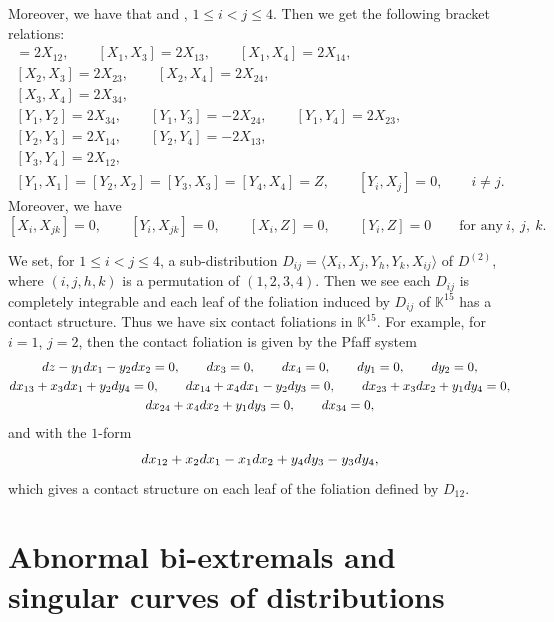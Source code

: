 \documentclass[11pt]{article}
\numberwithin{equation}{section}
\numberwithin{equation}{section}
\theoremstyle{definition}
\newcommand{\KK}{\mathbb{K}}
\newcommand{\0}{\boldsymbol{0}}
\newcommand{\pa}{\partial}
\begin{document}
Moreover, we have that
\smash{$Z = \frac{\pa}{\pa z}$} and \smash{$X_{ij} = \frac{\pa}{\pa x_{ij}}$}, $1 \leq i < j \leq 4$.
Then we get the following bracket relations:
\begin{gather*}
[X_1, X_2] = 2X_{12},\qquad [X_1, X_3] = 2X_{13},\qquad [X_1, X_4] = 2X_{14},
\\
 [X_2, X_3] = 2X_{23},\qquad [X_2, X_4] = 2X_{24},
\\
 [X_3, X_4] = 2X_{34},
\\
[Y_1, Y_2] = 2X_{34},\qquad [Y_1, Y_3] = -2X_{24},\qquad [Y_1, Y_4] = 2X_{23},
\\
 [Y_2, Y_3] = 2X_{14},\qquad [Y_2, Y_4] = -2X_{13},
\\
 [Y_3, Y_4] = 2X_{12},
\\
[Y_1, X_1] = [Y_2, X_2] = [Y_3, X_3] = [Y_4, X_4] = Z, \qquad [Y_i, X_j] = 0, \qquad i \not= j.
\end{gather*}
Moreover, we have
\[
[X_i, X_{jk}] = 0, \qquad [Y_i, X_{jk}] = 0, \qquad [X_i, Z] = 0, \qquad [Y_i, Z] = 0 \qquad \text{for any} \ i, \ j, \ k.
\]

\begin{Remark}
We set, for $1 \leq i < j \leq 4$, a sub-distribution
$D_{ij} = \langle X_i, X_j, Y_h, Y_k, X_{ij}\rangle$ of $D^{(2)}$, where $(i, j, h, k)$ is a permutation of $(1, 2, 3, 4)$.
Then we see each $D_{ij}$ is completely integrable
and each leaf of the foliation induced by $D_{ij}$ of $\KK^{15}$ has a contact structure.
Thus we have six contact foliations in $\KK^{15}$.
For example, for $i = 1$, $j = 2$, then the contact foliation is given by the Pfaff system
\begin{gather*}
{\rm d}z - y_1{\rm d}x_1 - y_2{\rm d}x_2 = 0,\qquad {\rm d}x_3 = 0,\qquad {\rm d}x_4 = 0,\qquad {\rm d}y_1 = 0,\qquad {\rm d}y_2 = 0,
\\
{\rm d}x_{13} + x_3{\rm d}x_1 + y_2{\rm d}y_4 = 0,\qquad {\rm d}x_{14} + x_4{\rm d}x_1 - y_2{\rm d}y_3 = 0,\qquad
{\rm d}x_{23} + x_3{\rm d}x_2 + y_1{\rm d}y_4 = 0,
\\
{\rm d}x_{24} + x_4{\rm d}x_2 + y_1{\rm d}y_3 = 0,\qquad {\rm d}x_{34} = 0,
\end{gather*}
and with the $1$-form
\[
{\rm d}x_{12} + x_2{\rm d}x_1 - x_1{\rm d}x_2 + y_4{\rm d}y_3 - y_3{\rm d}y_4,
\]
which gives a contact structure on each leaf of the foliation defined by $D_{12}$.
\end{Remark}

\section{Abnormal bi-extremals and singular curves of distributions}
\label{Abnormal-bi-extremals-general}
\end{document}
